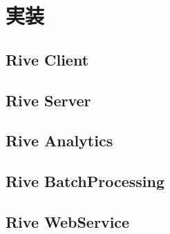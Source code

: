 \chapter{実装}
\label{implementation}

\section{Rive Client}

\section{Rive Server}

\section{Rive Analytics}

\section{Rive BatchProcessing}

\section{Rive WebService}
